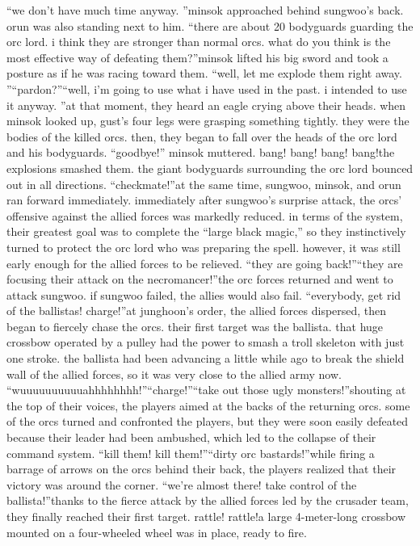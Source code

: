 “we don’t have much time anyway.
”minsok approached behind sungwoo’s back.
 orun was also standing next to him.
“there are about 20 bodyguards guarding the orc lord.
 i think they are stronger than normal orcs.
 what do you think is the most effective way of defeating them?”minsok lifted his big sword and took a posture as if he was racing toward them.
“well, let me explode them right away.
”“pardon?”“well, i’m going to use what i have used in the past.
 i intended to use it anyway.
”at that moment, they heard an eagle crying above their heads.
 when minsok looked up, gust’s four legs were grasping something tightly.
they were the bodies of the killed orcs.
 then, they began to fall over the heads of the orc lord and his bodyguards.
“goodbye!” minsok muttered.
bang! bang! bang! bang!the explosions smashed them.
 the giant bodyguards surrounding the orc lord bounced out in all directions.
“checkmate!”at the same time, sungwoo, minsok, and orun ran forward immediately.
immediately after sungwoo’s surprise attack, the orcs’ offensive against the allied forces was markedly reduced.
in terms of the system, their greatest goal was to complete the “large black magic,” so they instinctively turned to protect the orc lord who was preparing the spell.
however, it was still early enough for the allied forces to be relieved.
“they are going back!”“they are focusing their attack on the necromancer!”the orc forces returned and went to attack sungwoo.
 if sungwoo failed, the allies would also fail.
“everybody, get rid of the ballistas! charge!”at junghoon’s order, the allied forces dispersed, then began to fiercely chase the orcs.
their first target was the ballista.
 that huge crossbow operated by a pulley had the power to smash a troll skeleton with just one stroke.
the ballista had been advancing a little while ago to break the shield wall of the allied forces, so it was very close to the allied army now.
“wuuuuuuuuuuahhhhhhhh!”“charge!”“take out those ugly monsters!”shouting at the top of their voices, the players aimed at the backs of the returning orcs.
some of the orcs turned and confronted the players, but they were soon easily defeated because their leader had been ambushed, which led to the collapse of their command system.
“kill them! kill them!”“dirty orc bastards!”while firing a barrage of arrows on the orcs behind their back, the players realized that their victory was around the corner.
“we’re almost there! take control of the ballista!”thanks to the fierce attack by the allied forces led by the crusader team, they finally reached their first target.
rattle! rattle!a large 4-meter-long crossbow mounted on a four-wheeled wheel was in place, ready to fire.
